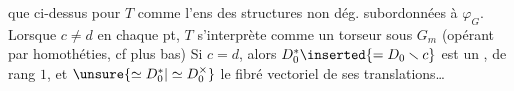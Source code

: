 
que ci-dessus pour $T$ comme l'ens des structures  non dég. subordonnées à $\varphi_G$. Lorsque $c\ne d$ en chaque pt, $T$ s'interprète comme un torseur sous $G_m$ (opérant par homothéties, cf plus bas) Si $c=d$, alors $D_0^*\inserted{=D_0\smallsetminus c}$ est un ,   de rang $1$,  et $\unsure{\simeq D_0^*|\simeq D_0^\times}$ le fibré vectoriel  de ses translations\ldots

